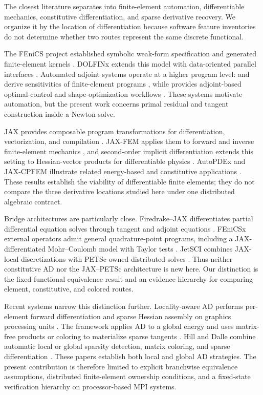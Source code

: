 \label{sec:related}

The closest literature separates into finite-element automation,
differentiable mechanics, constitutive differentiation, and sparse derivative
recovery. We organize it by the location of differentiation because software
feature inventories do not determine whether two routes represent the same
discrete functional.

The FEniCS project established symbolic weak-form specification and generated
finite-element kernels \citep{logg2012fenicsbook}. DOLFINx extends this model
with data-oriented parallel interfaces \citep{baratta2025dolfinx}. Automated
adjoint systems operate at a higher program level:  and
 derive sensitivities of finite-element programs
\citep{farrell2013dolfinadjoint,mitusch2019pyadjoint}, while 
provides adjoint-based optimal-control and shape-optimization workflows
\citep{blauth2023cashocsv2}. These systems motivate automation, but the present
work concerns primal residual and tangent construction inside a Newton solve.

JAX provides composable program transformations for differentiation,
vectorization, and compilation \citep{jax2018,baydin2018autodiff}. JAX-FEM
applies them to forward and inverse finite-element mechanics
\citep{xue2023jaxfem}, and second-order implicit differentiation extends this
setting to Hessian-vector products for differentiable physics
\citep{xue2026implicit}. AutoPDEx and JAX-CPFEM illustrate related
energy-based and constitutive applications
\citep{bode2025autopdex,hu2025jaxcpfem}. These results establish the viability
of differentiable finite elements; they do not compare the three derivative
locations studied here under one distributed algebraic contract.

Bridge architectures are particularly close. Firedrake--JAX differentiates
partial differential equation solves through tangent and adjoint equations
\citep{yashchuk2023bringing}.
FEniCSx external operators admit general quadrature-point programs, including
a JAX-differentiated Mohr--Coulomb model with Taylor tests
\citep{latyshev2025externaloperators}. JetSCI combines JAX-local
discretizations with PETSc-owned distributed solves
\citep{cattaneo2026jetsci}. Thus neither constitutive AD nor the JAX--PETSc
architecture is new here. Our distinction is the fixed-functional equivalence
result and an evidence hierarchy for comparing element, constitutive, and
colored routes.

Recent systems narrow this distinction further. Locality-aware AD performs
per-element forward differentiation and sparse Hessian assembly on graphics
processing units
\citep{mahmoud2025locality}. The  framework applies AD to a global
energy and uses matrix-free products or coloring to materialize sparse
tangents \citep{pundir2026tatva}. Hill and Dalle combine automatic local or
global sparsity detection, matrix coloring, and sparse differentiation
\citep{hill2025sparser}. These papers establish both local and global AD
strategies. The present contribution is therefore limited to explicit
branchwise equivalence assumptions, distributed finite-element ownership
conditions, and a fixed-state verification hierarchy on processor-based MPI
systems.

